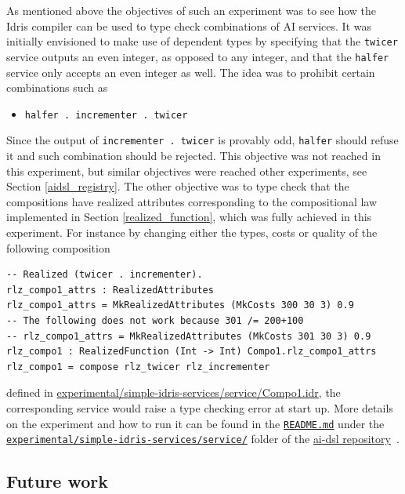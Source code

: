 \documentclass[]{report}
\newcommand{\nil}[2][]{\todo[color=purple,author=nil, #1]{#2}}
\begin{document}
As mentioned above the objectives of such an experiment was to see how
the Idris compiler can be used to type check combinations of AI
services.  It was initially envisioned to make use of dependent types
by specifying that the \texttt{twicer} service outputs an even
integer, as opposed to any integer, and that the \texttt{halfer}
service only accepts an even integer as well.  The idea was to
prohibit certain combinations such as
\begin{itemize}
\item \texttt{halfer . incrementer . twicer}
\end{itemize}
Since the output of \texttt{incrementer . twicer} is provably odd,
\texttt{halfer} should refuse it and such combination should be
rejected.  This objective was not reached in this experiment, but
similar objectives were reached other experiments, see Section
\ref{aidsl_registry}\nil{Add ref to Sam's work}.  The other objective
was to type check that the compositions have realized attributes
corresponding to the compositional law implemented in Section
\ref{realized_function}, which was fully achieved in this experiment.
For instance by changing either the types, costs or quality of the
following composition
\begin{verbatim}
-- Realized (twicer . incrementer).
rlz_compo1_attrs : RealizedAttributes
rlz_compo1_attrs = MkRealizedAttributes (MkCosts 300 30 3) 0.9
-- The following does not work because 301 /= 200+100
-- rlz_compo1_attrs = MkRealizedAttributes (MkCosts 301 30 3) 0.9
rlz_compo1 : RealizedFunction (Int -> Int) Compo1.rlz_compo1_attrs
rlz_compo1 = compose rlz_twicer rlz_incrementer
\end{verbatim}
defined in
\href{https://github.com/singnet/ai-dsl/blob/master/experimental/simple-idris-services/service/Compo1.idr}{experimental/simple-idris-services/service/Compo1.idr},
the corresponding service would raise a type checking error at start
up.  More details on the experiment and how to run it can be found in
the
\href{https://github.com/singnet/ai-dsl/blob/master/experimental/simple-idris-services/README.md}{\texttt{README.md}}
under the
\href{https://github.com/singnet/ai-dsl/blob/master/experimental/simple-idris-services/}{\texttt{experimental/simple-idris-services/service/}}
folder of the \href{https://github.com/singnet/ai-dsl/}{ai-dsl
  repository}~\cite{AIDSLRepo}.

\subsection{Future work}
\end{document}
